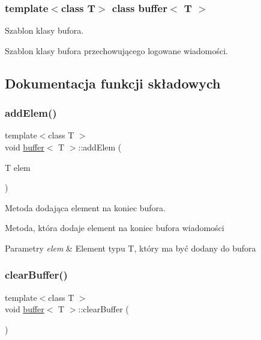 \subsubsection*{template$<$class T$>$\newline
class buffer$<$ T $>$}

Szablon klasy bufora. 

Szablon klasy bufora przechowującego logowane wiadomości. 

\subsection{Dokumentacja funkcji składowych}
\mbox{\label{classbuffer_ac93ddd3a9a4bfbb30dc4df278cb51f8a}} 
\subsubsection{\texorpdfstring{add\+Elem()}{addElem()}}
{\footnotesize\ttfamily template$<$class T $>$ \\
void \hyperlink{classbuffer}{buffer}$<$ T $>$\+::add\+Elem (\begin{DoxyParamCaption}\item[{T}]{elem }\end{DoxyParamCaption})}



Metoda dodająca element na koniec bufora. 

Metoda, która dodaje element na koniec bufora wiadomości 
\begin{DoxyParams}{Parametry}
{\em elem} & Element typu T, który ma być dodany do bufora \\
\hline
\end{DoxyParams}
\mbox{\label{classbuffer_ab0d55e3e80f82ff361c9a6f14599fe19}} 
\subsubsection{\texorpdfstring{clear\+Buffer()}{clearBuffer()}}
{\footnotesize\ttfamily template$<$class T $>$ \\
void \hyperlink{classbuffer}{buffer}$<$ T $>$\+::clear\+Buffer (\begin{DoxyParamCaption}{ }\end{DoxyParamCaption})}



